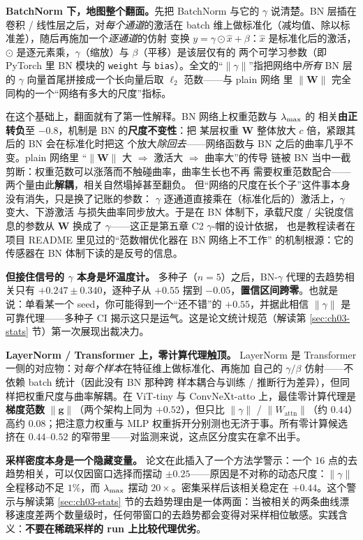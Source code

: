 \textbf{BatchNorm 下，地图整个翻面。}先把 BatchNorm 与它的 $\gamma$
说清楚。BN 层插在卷积 / 线性层之后，对\emph{每个通道}的激活在 batch
维上做标准化（减均值、除以标准差），随后再施加一个\emph{逐通道}的仿射
变换 $y=\gamma\odot\hat{x}+\beta$：$\hat{x}$ 是标准化后的激活，
$\odot$ 是逐元素乘，$\gamma$（缩放）与 $\beta$（平移）是该层仅有的
两个可学习参数（即 PyTorch 里 BN 模块的 \texttt{weight} 与
\texttt{bias}）。全文的“$\|\gamma\|$”指把网络中\emph{所有} BN 层的
$\gamma$ 向量首尾拼接成一个长向量后取 $\ell_2$ 范数——与 plain 网络
里 $\|\mathbf{W}\|$ 完全同构的一个“网络有多大的尺度”指标。

在这个基础上，翻面就有了第一性解释。BN 网络上权重范数与 $\lambda_{\max}$ 的
相关\textbf{由正转负}至 $-0.8$，机制是 BN 的\textbf{尺度不变性}：把
某层权重 $\mathbf{W}$ 整体放大 $c$ 倍，紧跟其后的 BN 会在标准化时把这
个放大\emph{除回去}——网络函数与 BN 之后的曲率几乎不变。plain 网络里
“$\|\mathbf{W}\|$ 大 $\Rightarrow$ 激活大 $\Rightarrow$ 曲率大”的传导
链被 BN 当中一截剪断：权重范数可以涨落而不触碰曲率，曲率生长也不再
需要权重范数配合——两个量由此\textbf{解耦}，相关自然塌掉甚至翻负。
但“网络的尺度在长个子”这件事本身没有消失，只是换了记账的参数：
$\gamma$ 逐通道直接乘在（标准化后的）激活上，$\gamma$ 变大、下游激活
与损失曲率同步放大。于是在 BN 体制下，承载尺度 / 尖锐度信息的参数从
$\mathbf{W}$ 换成了 $\gamma$——这正是第五章 C2 $\gamma$-帽的设计依据，
也是教程读者在项目 README 里见过的“范数帽优化器在 BN 网络上不工作”
的机制根源：它的传感器在 BN 体制下读的是反号的信息。

\textbf{但接住信号的 $\gamma$ 本身是坏温度计。}
多种子（$n{=}5$）之后，BN-$\gamma$ 代理的去趋势相关只有
$+0.247\pm0.340$，逐种子从 $+0.55$ 摆到
$-0.05$，\textbf{置信区间跨零}。也就是说：单看某一个
seed，你可能得到一个“还不错”的 $+0.55$，并据此相信 $\|\gamma\|$
是可靠代理——多种子 CI 揭示这只是运气。这是论文统计规范（解读第
\ref{sec:ch03-stats} 节）第一次展现出裁决力。

\textbf{LayerNorm / Transformer 上，零计算代理触顶。} LayerNorm 是
Transformer 一侧的对应物：对\emph{每个样本}在特征维上做标准化、再施加
自己的 $\gamma/\beta$ 仿射——不依赖 batch 统计（因此没有 BN 那种跨
样本耦合与训练 / 推断行为差异），但同样把权重尺度与曲率解耦。在
ViT-tiny 与 ConvNeXt-atto 上，最佳零计算代理是\textbf{梯度范数}
$\|\mathbf{g}\|$（两个架构上同为 $+0.52$），但只比 $\|\gamma\|$ /
$\|W_{\mathrm{attn}}\|$（约 $0.44$）高约 $0.08$；把注意力权重与 MLP
权重拆开分别测也无济于事。所有零计算候选挤在 $0.44$--$0.52$
的窄带里——对监测来说，这点区分度实在拿不出手。

\textbf{采样密度本身是一个隐藏变量。} 论文在此插入了一个方法学警示：一个 16
点的去趋势相关，可以仅因窗口选择而摆动
$\pm0.25$——原因是不对称的动态尺度：$\|\gamma\|$ 全程移动不足 $1\%$，而 $\lambda_{\max}$
摆动 $20\times$。密集采样后该相关稳定在 $+0.44$。这个警示与解读第
\ref{sec:ch03-stats}
节的去趋势理由是一体两面：当被相关的两条曲线漂移速度差两个数量级时，任何带窗口的去趋势都会变得对采样相位敏感。实践含义：\textbf{不要在稀疏采样的
run 上比较代理优劣}。

